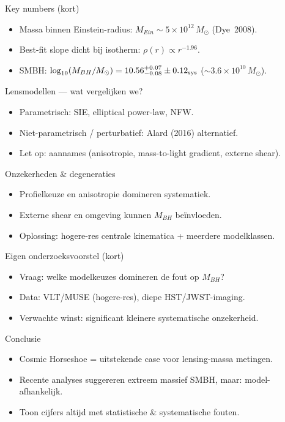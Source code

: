 \documentclass[aspectratio=169]{beamer}
\begin{document}
\begin{frame}{Key numbers (kort)}
  \begin{itemize}
    \item Massa binnen Einstein-radius: $M_{Ein}\sim5\times10^{12}\,M_\odot$ (Dye~2008).
    \item Best-fit slope dicht bij isotherm: $\rho(r)\propto r^{-1.96}$.
    \item SMBH: $\log_{10}(M_{BH}/M_\odot)=10.56^{+0.07}_{-0.08}\pm0.12_{\rm sys}$ ($\sim3.6\times10^{10}\,M_\odot$).
  \end{itemize}
\end{frame}

\begin{frame}{Lensmodellen — wat vergelijken we?}
  \begin{itemize}
    \item Parametrisch: SIE, elliptical power-law, NFW.
    \item Niet-parametrisch / perturbatief: Alard (2016) alternatief.
    \item Let op: aannames (anisotropie, mass-to-light gradient, externe shear).
  \end{itemize}
\end{frame}

\begin{frame}{Onzekerheden \& degeneraties}
  \begin{itemize}
    \item Profielkeuze en anisotropie domineren systematiek.
    \item Externe shear en omgeving kunnen $M_{BH}$ beïnvloeden.
    \item Oplossing: hogere-res centrale kinematica + meerdere modelklassen.
  \end{itemize}
\end{frame}

\begin{frame}{Eigen onderzoeksvoorstel (kort)}
  \begin{itemize}
    \item Vraag: welke modelkeuzes domineren de fout op $M_{BH}$?
    \item Data: VLT/MUSE (hogere-res), diepe HST/JWST-imaging.
    \item Verwachte winst: significant kleinere systematische onzekerheid.
  \end{itemize}
\end{frame}

\begin{frame}{Conclusie}
  \begin{itemize}
    \item Cosmic Horseshoe = uitstekende case voor lensing-massa metingen.
    \item Recente analyses suggereren extreem massief SMBH, maar: model-afhankelijk.
    \item Toon cijfers altijd met statistische \& systematische fouten.
  \end{itemize}
\end{frame}
\end{document}
